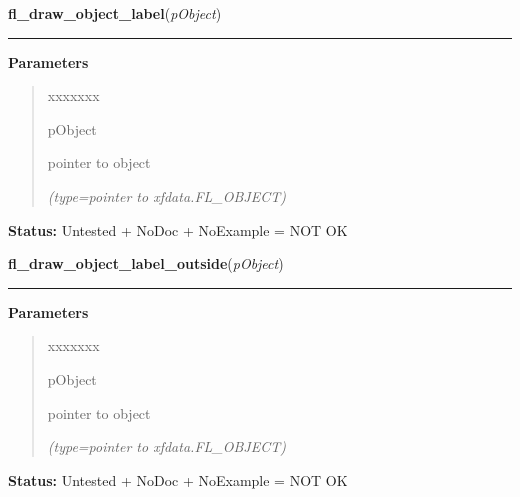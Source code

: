 \hspace{.8\funcindent}\begin{boxedminipage}{\funcwidth}

    \raggedright \textbf{fl\_draw\_object\_label}(\textit{pObject})

    \vspace{-1.5ex}

    \rule{\textwidth}{0.5\fboxrule}
\setlength{\parskip}{2ex}
\setlength{\parskip}{1ex}
      \textbf{Parameters}
      \vspace{-1ex}

      \begin{quote}
        \begin{Ventry}{xxxxxxx}

          \item[pObject]

          pointer to object

            {\it (type=pointer to xfdata.FL\_OBJECT)}

        \end{Ventry}

      \end{quote}

\textbf{Status:} Untested + NoDoc + NoExample = NOT OK



    \end{boxedminipage}

    \label{xformslib:library:fl_draw_object_label_outside}

    \vspace{0.5ex}

\hspace{.8\funcindent}\begin{boxedminipage}{\funcwidth}

    \raggedright \textbf{fl\_draw\_object\_label\_outside}(\textit{pObject})

    \vspace{-1.5ex}

    \rule{\textwidth}{0.5\fboxrule}
\setlength{\parskip}{2ex}
\setlength{\parskip}{1ex}
      \textbf{Parameters}
      \vspace{-1ex}

      \begin{quote}
        \begin{Ventry}{xxxxxxx}

          \item[pObject]

          pointer to object

            {\it (type=pointer to xfdata.FL\_OBJECT)}

        \end{Ventry}

      \end{quote}

\textbf{Status:} Untested + NoDoc + NoExample = NOT OK



    \end{boxedminipage}

